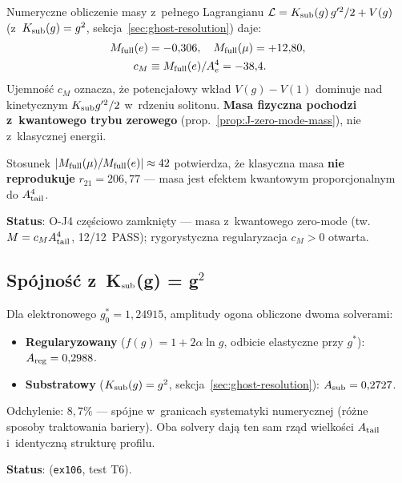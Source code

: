 \begin{remark}\label{rem:J2-cM}
Numeryczne obliczenie masy z~pe\l{}nego Lagrangianu
$\mathcal{L} = K_{\rm sub}(g)\,g'^2/2 + V(g)$ (z~$K_{\rm sub}(g) = g^2$,
sekcja~\ref{sec:ghost-resolution}) daje:
\begin{align}
  M_{\rm full}(e) &= -0{,}306, \quad
  M_{\rm full}(\mu) = +12{,}80, \\
  c_M &\equiv M_{\rm full}(e) / A_e^4 = -38{,}4.
\end{align}
Ujemno\'s\'c $c_M$ oznacza, \.ze potencja\l{}owy wk\l{}ad $V(g) - V(1)$
dominuje nad kinetycznym $K_{\rm sub} g'^2/2$ w~rdzeniu solitonu.
\textbf{Masa fizyczna pochodzi z~kwantowego trybu zerowego}
(prop.~\ref{prop:J-zero-mode-mass}), nie z~klasycznej energii.

Stosunek $|M_{\rm full}(\mu)/M_{\rm full}(e)| \approx 42$ potwierdza,
\.ze klasyczna masa \textbf{nie reprodukuje} $r_{21} = 206{,}77$
--- masa jest efektem kwantowym proporcjonalnym do $A_{\rm tail}^4$.

\textbf{Status}: O-J4 cz\k{e}\'sciowo zamkni\k{e}ty --- masa z~kwantowego
zero-mode (tw.~$M = c_M A_{\rm tail}^4$, 12/12~PASS);
rygorystyczna regularyzacja $c_M > 0$ otwarta.
\end{remark}

\subsection{Sp\'ojno\'s\'c z~K$_{\rm sub}$(g) = g$^2$}\label{app:J2-Ksub}

\begin{proposition}%
\label{prop:J2-Ksub-compat}
Dla elektronowego $g_0^* = 1{,}24915$, amplitudy ogona
obliczone dwoma solverami:
\begin{itemize}[nosep]
  \item \textbf{Regularyzowany} ($f(g) = 1 + 2\alpha\ln g$,
    odbicie elastyczne przy $g^*$): $A_{\rm reg} = 0{,}2988$.
  \item \textbf{Substratowy} ($K_{\rm sub}(g) = g^2$,
    sekcja~\ref{sec:ghost-resolution}): $A_{\rm sub} = 0{,}2727$.
\end{itemize}
Odchylenie: $8{,}7\%$ --- sp\'ojne w~granicach systematyki
numerycznej (r\'o\.zne sposoby traktowania bariery).
Oba solvery daj\k{a} ten sam rz\k{a}d wielko\'sci $A_{\rm tail}$
i~identyczn\k{a} struktur\k{e} profilu.

\textbf{Status}:  (\texttt{ex106}, test T6).
\end{proposition}

